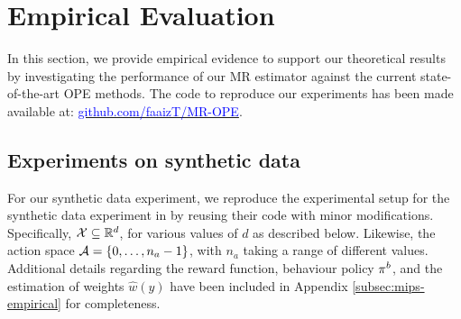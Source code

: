 \section{Empirical Evaluation}
In this section, we provide empirical evidence to support our theoretical results by investigating the performance of our MR estimator against the current state-of-the-art OPE methods. The code to reproduce our experiments has been made available at: \href{https://github.com/faaizT/MR-OPE}{\textcolor{blue}{github.com/faaizT/MR-OPE}}.

\subsection{Experiments on synthetic data}\label{sec:exp-synth}
For our synthetic data experiment, we reproduce the experimental setup for the synthetic data experiment in \cite{saito2022off} by reusing their code with minor modifications.
Specifically, $\mathcal{X} \subseteq \mathbb{R}^d$, for various values of $d$ as described below. Likewise, the action space $\mathcal{A} = \{0, \dots, n_a-1\}$, with $n_a$ taking a range of different values. Additional details regarding the reward function, behaviour policy $\pi^b$, and the estimation of weights $\hat{w}(y)$ have been included in Appendix \ref{subsec:mips-empirical} for completeness. 




